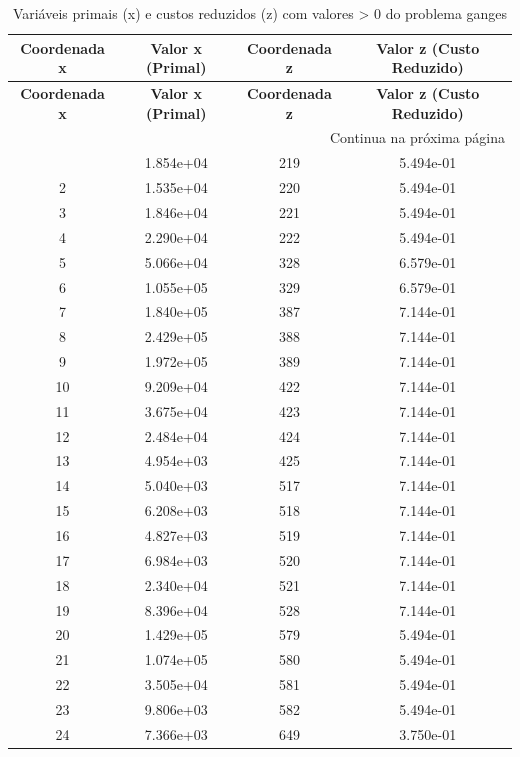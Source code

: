 \documentclass[12pt]{article}
\begin{document}
\begin{longtable}{@{}cccc@{}}
\caption{Variáveis primais (x) e custos reduzidos (z) com valores > 0 do problema ganges} \\
\toprule
\textbf{Coordenada x} & \textbf{Valor x (Primal)} & \textbf{Coordenada z} & \textbf{Valor z (Custo Reduzido)} \\
\midrule
\endfirsthead

\toprule
\textbf{Coordenada x} & \textbf{Valor x (Primal)} & \textbf{Coordenada z} & \textbf{Valor z (Custo Reduzido)} \\
\midrule
\endhead

\midrule \multicolumn{4}{r}{{Continua na próxima página}} \\ \midrule
\endfoot

\bottomrule
\endlastfoot
1 & 1.854e+04 & 219 & 5.494e-01 \\
2 & 1.535e+04 & 220 & 5.494e-01 \\
3 & 1.846e+04 & 221 & 5.494e-01 \\
4 & 2.290e+04 & 222 & 5.494e-01 \\
5 & 5.066e+04 & 328 & 6.579e-01 \\
6 & 1.055e+05 & 329 & 6.579e-01 \\
7 & 1.840e+05 & 387 & 7.144e-01 \\
8 & 2.429e+05 & 388 & 7.144e-01 \\
9 & 1.972e+05 & 389 & 7.144e-01 \\
10 & 9.209e+04 & 422 & 7.144e-01 \\
11 & 3.675e+04 & 423 & 7.144e-01 \\
12 & 2.484e+04 & 424 & 7.144e-01 \\
13 & 4.954e+03 & 425 & 7.144e-01 \\
14 & 5.040e+03 & 517 & 7.144e-01 \\
15 & 6.208e+03 & 518 & 7.144e-01 \\
16 & 4.827e+03 & 519 & 7.144e-01 \\
17 & 6.984e+03 & 520 & 7.144e-01 \\
18 & 2.340e+04 & 521 & 7.144e-01 \\
19 & 8.396e+04 & 528 & 7.144e-01 \\
20 & 1.429e+05 & 579 & 5.494e-01 \\
21 & 1.074e+05 & 580 & 5.494e-01 \\
22 & 3.505e+04 & 581 & 5.494e-01 \\
23 & 9.806e+03 & 582 & 5.494e-01 \\
24 & 7.366e+03 & 649 & 3.750e-01 \\

\end{longtable}
\end{document}
